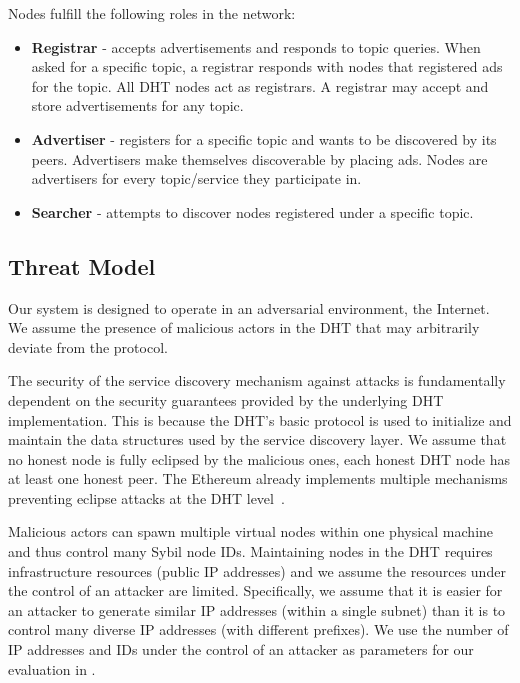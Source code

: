 Nodes fulfill the following roles in the network:

\begin{itemize}
    \item \textbf{Registrar} - accepts advertisements and responds to topic queries. When asked for a specific topic, a registrar responds with nodes that registered ads for the topic.  All DHT nodes act as registrars. A registrar may accept and store advertisements for any topic.
    \item \textbf{Advertiser} - registers for a specific topic and wants to be discovered by its peers. Advertisers make themselves discoverable by placing ads. Nodes are advertisers for every topic/service they participate in.
    \item \textbf{Searcher} - attempts to discover nodes registered under a specific topic.
\end{itemize}

\subsection{Threat Model}
\label{sec:threat}
Our system is designed to operate in an adversarial environment, \ie the Internet. We assume the presence of malicious actors in the DHT that may arbitrarily deviate from the protocol.

The security of the service discovery mechanism against attacks is fundamentally dependent on the security guarantees provided by the underlying DHT implementation. This is because the DHT's basic protocol is used to initialize and maintain the data structures used by the service discovery layer. We assume that no honest node is fully eclipsed by the malicious ones, \ie each honest DHT node has at least one honest peer. The Ethereum already implements multiple mechanisms preventing eclipse attacks at the DHT level~\cite{marcus2018low, henningsen2019eclipsing}.  

Malicious actors can spawn multiple virtual nodes within one physical machine and thus control many Sybil node IDs. Maintaining nodes in the DHT requires infrastructure resources (public IP addresses) and we assume the resources under the control of an attacker are limited. Specifically, we assume that it is easier for an attacker to generate similar IP addresses (\ie within a single subnet) than it is to control many diverse IP addresses (with different prefixes). We use the number of IP addresses and IDs under the control of an attacker as parameters for our evaluation in .

